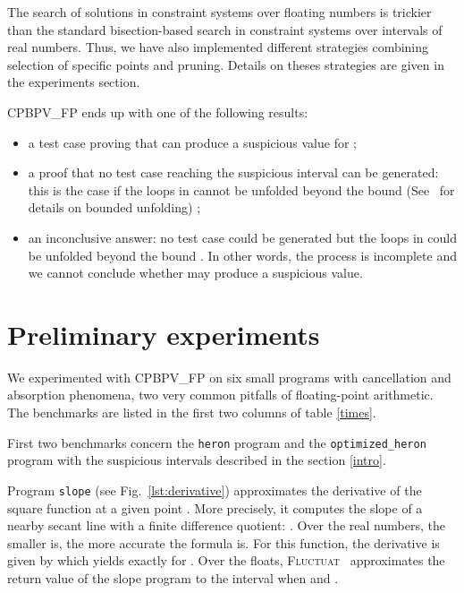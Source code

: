 \documentclass[a4paper]{llncs}
\newcommand{\FLUCTUAT}{\textsc{Fluctuat}}
\newcommand{\OUR}{\textsc{CPBPV\_FP}}
\begin{document}
The search of solutions in constraint systems over floating numbers is trickier than the standard bisection-based search in constraint systems over intervals of real numbers. Thus, we have also implemented different strategies combining selection of specific points and pruning. Details on theses strategies are given in the experiments section.

\OUR{} ends up with one of the following results: 
\begin{itemize}
\item a test case proving that  can produce a suspicious value for
  ; 
\item a proof that no test case reaching the suspicious interval
  can be generated: this is the case if the loops in  cannot be
  unfolded beyond the bound  (See~\cite{collavizzaRueherVanHentenryck10} for
    details on bounded unfolding) ; 
\item an inconclusive answer: no test case could be generated but the
  loops in  could be unfolded beyond the bound . In other words,
  the process is incomplete and we cannot conclude whether  may
  produce a suspicious value.
\end{itemize}




\section{Preliminary experiments}
\label{sec:experiments}


We experimented with \OUR{} on  six small programs with cancellation
and absorption phenomena, two very common pitfalls of floating-point
arithmetic. The benchmarks are listed in the first two columns of table \ref{times}. 

First two benchmarks concern the {\tt heron} program and the {\tt optimized\_heron} program with the suspicious intervals described in the section  \ref{intro}. 

Program {\tt slope} (see Fig.~\ref{lst:derivative}) approximates the
derivative of the square function  at a given point
. More precisely, it computes the slope of a nearby
secant line with a finite difference quotient: .
Over the real numbers, the smaller  is, the more accurate the
formula is. For this function, the derivative is given by  which
yields exactly  for .  Over the floats,
\FLUCTUAT{}~\cite{delmasGoubaultPutotSouyrisTekkalVedrine09}
approximates the return value of the slope program to the interval
 when  and
.
\end{document}
